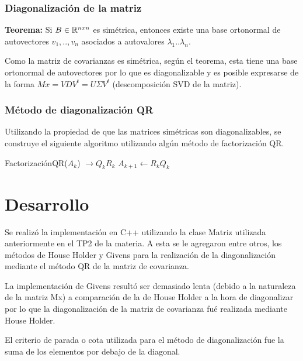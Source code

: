 \documentclass[a4paper,10pt,twoside]{article}
\begin{document}
\subsubsection{Diagonalización de la matriz}
\textbf{Teorema:}
Si $\mathnormal{B} \in \mathbb{R}^{nxn}$ es simétrica, entonces existe una base ortonormal de autovectores ${v_1,..,v_n}$ asociados a autovalores $\lambda_1 .. \lambda_n$.

Como la matriz de covarianzas es simétrica, según el teorema, esta tiene una base ortonormal de autovectores por lo que es diagonalizable y es posible expresarse de la forma $Mx = VDV^{t} = U \Sigma V^{t}$ (descomposición SVD de la matriz).

\subsubsection{Método de diagonalización QR}
Utilizando la propiedad de que las matrices simétricas son diagonalizables, se construye el siguiente algoritmo utilizando algún método de factorización QR.

\begin{algorithmic}
    \STATE FactorizaciónQR($A_k$) $\rightarrow Q_k R_k$
    \STATE $A_{k+1} \leftarrow R_k Q_k$
  \ENDWHILE
\end{algorithmic}




\section{Desarrollo}
Se realizó la implementación en C++ utilizando la clase Matriz utilizada anteriormente en el TP2 de la materia. A esta se le agregaron entre otros, los métodos de House Holder y Givens para la realización de la diagonalización mediante el método QR de la matriz de covarianza.

La implementación de Givens resultó ser demasiado lenta (debido a la naturaleza de la matriz Mx) a comparación de la de House Holder a la hora de diagonalizar por lo que la diagonalización de la matriz de covarianza fué realizada mediante House Holder.

El criterio de parada o cota utilizada para el método de diagonalización fue la suma de los elementos por debajo de la diagonal.
\end{document}
